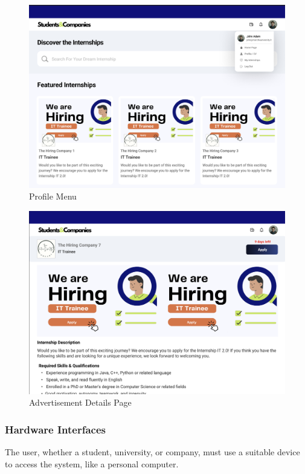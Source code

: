 \documentclass{article}
\begin{document}
\begin{figure}[H]
    \centering
    \includegraphics[scale = 0.40]{figures/UserInterfaces/ProfilMenu.png}
    \caption{Profile Menu}
     \centering
\end{figure}

\begin{figure}[H]
    \centering
    \includegraphics[scale = 0.40]{figures/UserInterfaces/AdvertisementPage.png}
    \caption{Advertisement Details Page}
     \centering
\end{figure}

\subsubsection{Hardware Interfaces}
    The user, whether a student, university, or company, must use a suitable device to access the system, like a personal computer.
\end{document}
